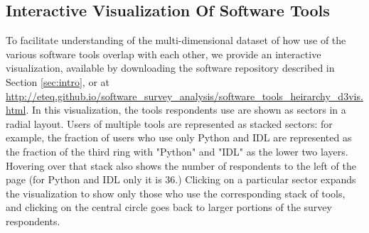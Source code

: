 \subsection{Interactive Visualization Of Software Tools}
\label{ssec:d3viz}

To facilitate understanding of the multi-dimensional dataset of how use of the various software tools overlap with each other, we provide an interactive visualization, available by downloading the software repository described in Section \ref{sec:intro}, or at \url{http://eteq.github.io/software_survey_analysis/software_tools_heirarchy_d3vis.html}. In this visualization, the tools respondents use are shown as sectors in a radial layout.  Users of multiple tools are represented as stacked sectors: for example, the fraction of users who use only Python and IDL are represented as the fraction of the third ring with "Python" and "IDL" as the lower two layers.  Hovering over that stack also shows the number of respondents to the left of the page (for Python and IDL only it is 36.)  Clicking on a particular sector expands the visualization to show only those who use the corresponding stack of tools, and clicking on the central circle goes back to larger portions of the survey respondents.